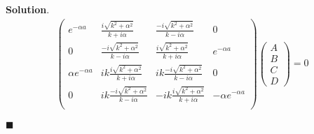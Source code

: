 \documentclass[12pt]{article}
\theoremstyle{definition}
\newenvironment{s}{%
        \begin{trivlist} \item \textbf{Solution}. }{%
            \hspace*{\fill} $\blacksquare$\end{trivlist}}%
\begin{document}
{\begin{s}
\begin{align*}
\begin{pmatrix}
e^{-\alpha a} & \frac{i\sqrt{k^{2} + \alpha^{2}}}{k+i\alpha} & \frac{-i\sqrt{k^{2} + \alpha^{2}}}{k-i\alpha} & 0\\
0 & \frac{-i\sqrt{k^{2} + \alpha^{2}}}{k-i\alpha} & \frac{i\sqrt{k^{2} + \alpha^{2}}}{k+i\alpha} & e^{-\alpha a}\\
\alpha e^{-\alpha a} & ik\frac{i\sqrt{k^{2} + \alpha^{2}}}{k+i\alpha} & ik\frac{-i\sqrt{k^{2} + \alpha^{2}}}{k-i\alpha} & 0\\
0 & ik\frac{-i\sqrt{k^{2} + \alpha^{2}}}{k-i\alpha} & -ik\frac{i\sqrt{k^{2} + \alpha^{2}}}{k+i\alpha} & -\alpha e^{-\alpha a}\\
\end{pmatrix}\begin{pmatrix}A\\B\\C\\D\end{pmatrix} = 0
\end{align*}


\end{s}
\end{document}
